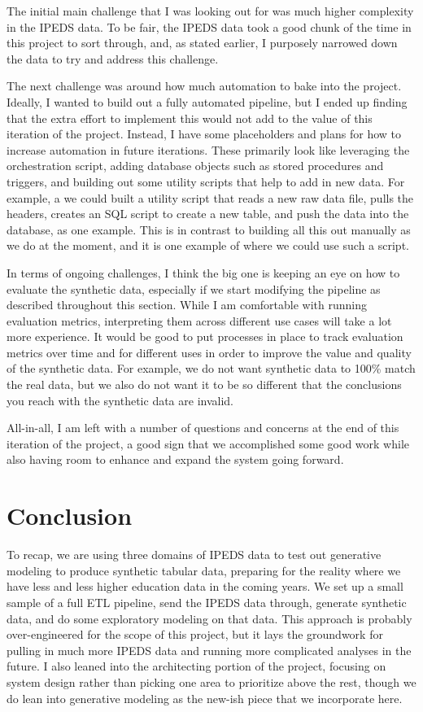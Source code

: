 \documentclass[sigconf, authorversion, nonacm]{acmart}
\begin{document}
    The initial main challenge that I was looking out for was much higher complexity in the IPEDS data. To be fair, the IPEDS data took a good chunk of the time in this project to sort through, and, as stated earlier, I purposely narrowed down the data to try and address this challenge.

    The next challenge was around how much automation to bake into the project. Ideally, I wanted to build out a fully automated pipeline, but I ended up finding that the extra effort to implement this would not add to the value of this iteration of the project. Instead, I have some placeholders and plans for how to increase automation in future iterations. These primarily look like leveraging the orchestration script, adding database objects such as stored procedures and triggers, and building out some utility scripts that help to add in new data. For example, a we could built a utility script that reads a new raw data file, pulls the headers, creates an SQL script to create a new table, and push the data into the database, as one example. This is in contrast to building all this out manually as we do at the moment, and it is one example of where we could use such a script.

    In terms of ongoing challenges, I think the big one is keeping an eye on how to evaluate the synthetic data, especially if we start modifying the pipeline as described throughout this section. While I am comfortable with running evaluation metrics, interpreting them across different use cases will take a lot more experience. It would be good to put processes in place to track evaluation metrics over time and for different uses in order to improve the value and quality of the synthetic data. For example, we do not want synthetic data to 100\% match the real data, but we also do not want it to be so different that the conclusions you reach with the synthetic data are invalid.

    All-in-all, I am left with a number of questions and concerns at the end of this iteration of the project, a good sign that we accomplished some good work while also having room to enhance and expand the system going forward.

\section{Conclusion}
    To recap, we are using three domains of IPEDS data to test out generative modeling to produce synthetic tabular data, preparing for the reality where we have less and less higher education data in the coming years. We set up a small sample of a full ETL pipeline, send the IPEDS data through, generate synthetic data, and do some exploratory modeling on that data. This approach is probably over-engineered for the scope of this project, but it lays the groundwork for pulling in much more IPEDS data and running more complicated analyses in the future. I also leaned into the architecting portion of the project, focusing on system design rather than picking one area to prioritize above the rest, though we do lean into generative modeling as the new-ish piece that we incorporate here.
\end{document}
